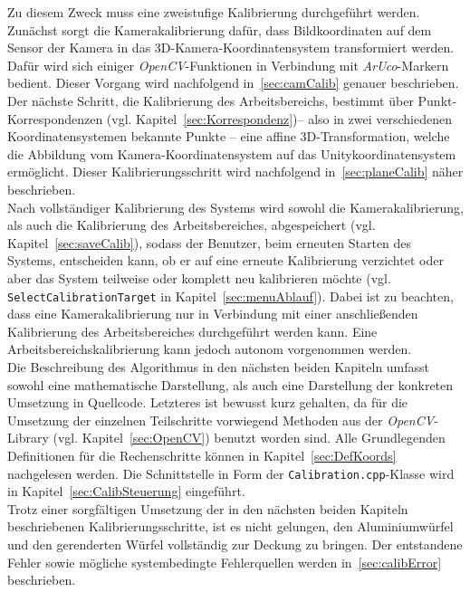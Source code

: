 Zu diesem Zweck muss eine zweistufige Kalibrierung durchgeführt werden. Zunächst sorgt die Kamerakalibrierung dafür, dass Bildkoordinaten auf dem Sensor der Kamera in das 3D-Kamera-Koordinatensystem transformiert werden. Dafür wird sich einiger \textit{OpenCV}-Funktionen in Verbindung mit \textit{ArUco}-Markern bedient. Dieser Vorgang wird nachfolgend in~\ref{sec:camCalib} genauer beschrieben.\\
Der nächste Schritt, die Kalibrierung des Arbeitsbereichs, bestimmt über Punkt-Korrespondenzen (vgl. Kapitel~\ref{sec:Korrespondenz})-- also in zwei verschiedenen Koordinatensystemen bekannte Punkte -- eine affine 3D-Transformation, welche die Abbildung vom Kamera-Koordinaten\-system auf das Unitykoordinatensystem ermöglicht. Dieser Kalibrierungsschritt wird nachfolgend in~\ref{sec:planeCalib} näher beschrieben.\\
Nach vollständiger Kalibrierung des Systems wird sowohl die Kamerakalibrierung, als auch die Kalibrierung des Arbeitsbereiches, abgespeichert (vgl. Kapitel~\ref{sec:saveCalib}), sodass der Benutzer, beim erneuten Starten des Systems, entscheiden kann, ob er auf eine erneute Kalibrierung verzichtet oder aber das System teilweise oder komplett neu kalibrieren möchte (vgl. \texttt{Select\-Calibration\-Target} in Kapitel~\ref{sec:menuAblauf}). Dabei ist zu beachten, dass eine Kamerakalibrierung nur in Verbindung mit einer anschließenden Kalibrierung des Arbeitsbereiches durchgeführt werden kann. Eine Arbeitsbereichskalibrierung kann jedoch autonom vorgenommen werden. \\
Die Beschreibung des Algorithmus in den nächsten beiden Kapiteln umfasst sowohl eine mathematische Darstellung, als auch eine Darstellung der konkreten Umsetzung in Quellcode. Letzteres ist bewusst kurz gehalten, da für die Umsetzung der einzelnen Teilschritte vorwiegend Methoden aus der \textit{OpenCV}-Library (vgl. Kapitel~\ref{sec:OpenCV}) benutzt worden sind. Alle Grundlegenden Definitionen für die Rechenschritte können in Kapitel~\ref{sec:DefKoords} nachgelesen werden. Die Schnittstelle in Form der \texttt{Calibration.cpp}-Klasse wird in Kapitel~\ref{sec:CalibSteuerung} eingeführt.\\
Trotz einer sorgfältigen Umsetzung der in den nächsten beiden Kapiteln beschriebenen Kalibrierungsschritte, ist es nicht gelungen, den Aluminiumwürfel und den gerenderten Würfel vollständig zur Deckung zu bringen. Der entstandene Fehler sowie mögliche systembedingte Fehlerquellen werden in~\ref{sec:calibError} beschrieben. 

